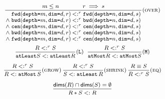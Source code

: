 \documentclass[10pt,preprint]{sigplanconf}
\theoremstyle{definition}
\newcommand{\term}[1]{\texttt{#1}}
\newcommand{\stenFwdSR}[3]{\term{fwd} (\term{depth=}#1,
  \term{dim=}#2, #3)}
\newcommand{\stenBwdSR}[3]{\term{bwd} (\term{depth=}#1,
  \term{dim=}#2, #3)}
\newcommand{\stenCenSR}[3]{\term{cen} (\term{depth=}#1,
  \term{dim=}#2, #3)}
\newcommand{\trule}[1]{{\footnotesize{(\text{#1})}}}
\begin{document}
\begin{figure}[t]
\vspace{-0.5em}
\begin{align*}
\hspace{-0.5em}
{\small{
\begin{array}{c}
%
\vspace{-0.4em}
\setlength{\arraycolsep}{0.1em}
\dfrac{\hspace{3em} m \leq n \qquad\qquad r \implies s \hspace{3em}}
{\begin{array}{rl}
\stenFwdSR{m}{d}{r} & <:^r \stenFwdSR{n}{d}{s}
\\
\wedge \; \stenBwdSR{m}{d}{r} & <:^r \stenBwdSR{n}{d}{s}
\\
\wedge \; \stenCenSR{m}{d}{r} & <:^r \stenCenSR{n}{d}{s}
\\
\wedge \; \stenBwdSR{m}{d}{r} & <:^r \stenCenSR{n}{d}{s} \\
\wedge \; \stenFwdSR{m}{d}{r} & <:^r \stenCenSR{n}{d}{s} \\[1.2em]
\end{array}}\trule{\textsc{over}} \\[-0.2em]
%
%
\dfrac{R <:^r S}{\term{atLeast}  S <: \term{atLeast}
  R}\trule{\texttt{L}}
\;\;
\dfrac{R <:^r S}{\term{atMost}  R <: \term{atMost}
  S}\trule{\texttt{M}} \\[1.5em]
\dfrac{R <:^r S}{R <: \term{atMost} \, S}\trule{\textsc{grow}} \,
\dfrac{R <:^r S}{S <: \term{atLeast} \, R}\trule{\textsc{shrink}} \,
\dfrac{R \equiv S}{R <:^r S}\trule{\textsc{eq}}
 \\[1.5em]
\dfrac{\mathsf{dims}(R) \cap \mathsf{dims}(S) = \emptyset}{R \ast S <: R}

\end{array}}}
\end{align*}
\end{figure}
\end{document}
